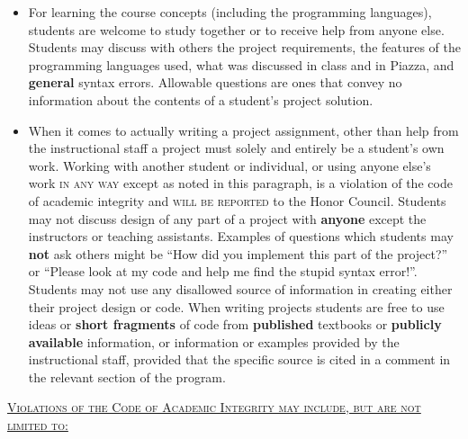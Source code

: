 \documentclass[10pt]{article}
\begin{document}
    \vspace{-2.25mm}

    \begin{itemize}

      \addtolength{\itemsep}{-1.75mm}

      \item For learning the course concepts (including the programming
            languages), students are welcome to study together or to receive
            help from anyone else.  Students may discuss with others the
            project requirements, the features of the programming languages
            used, what was discussed in class and in Piazza, and
            \textbf{general} syntax errors.  Allowable questions are ones
            that convey no information about the contents of a student's
            project solution.

      \item When it comes to actually writing a project assignment, other
            than help from the instructional staff a project must solely and
            entirely be a student's own work.  Working with another student
            or individual, or using anyone else's work \textsc{in any way}
            except as noted in this paragraph, is a violation of the code of
            academic integrity and \textsc{will be reported} to the Honor
            Council.  Students may not discuss design of any part of a
            project with \textbf{anyone} except the instructors or teaching
            assistants.  Examples of questions which students may
            \textbf{not} ask others might be ``How did you implement this
            part of the project?'' or ``Please look at my code and help me
            find the stupid syntax error!''.  Students may not use any
            disallowed source of information in creating either their
            project design or code.  When writing projects students are free
            to use ideas or \textbf{short fragments} of code from
            \textbf{published} textbooks or \textbf{publicly available}
            information, or information or examples provided by the
            instructional staff, provided that the specific source is cited
            in a comment in the relevant section of the program.

    \end{itemize}

    \vspace{-2.25mm}

    \noindent
    \underline{\textsc{Violations of the Code of Academic Integrity
  may include, but are not limited to:}}
\end{document}

